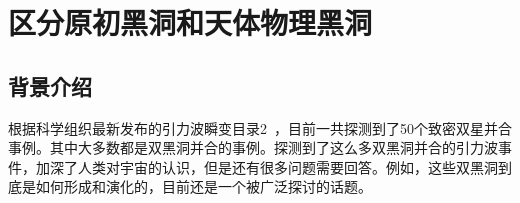 \chapter{区分原初黑洞和天体物理黑洞}\label{chap:distinguish}


\section{背景介绍}
根据\lvc 科学组织最新发布的引力波瞬变目录2~\cite{Abbott:2020niy}，目前一共探测到了50个致密双星并合事例。其中大多数都是双黑洞并合的事例。探测到了这么多双黑洞并合的引力波事件，加深了人类对宇宙的认识，但是还有很多问题需要回答。例如，这些双黑洞到底是如何形成和演化的，目前还是一个被广泛探讨的话题\cite{Bird:2016dcv,Sasaki:2016jop,Chen:2018czv,Clesse:2017bsw,Fishbach:2017dwv,Clesse:2016vqa,Antonini:2016gqe,Inayoshi:2017mrs,Ali-Haimoud:2017rtz,Perna:2019axr,Kavanagh:2018ggo,Rodriguez:2015oxa,Rodriguez:2016kxx,Park:2017zgj,Wu:2020drm,Belczynski:2014iua,Belczynski:2016obo,Woosley:2016nnw,Rodriguez:2018rmd,Choksi:2018jnq,2010AIPC.1314..291D,deMink:2016vkw}。

